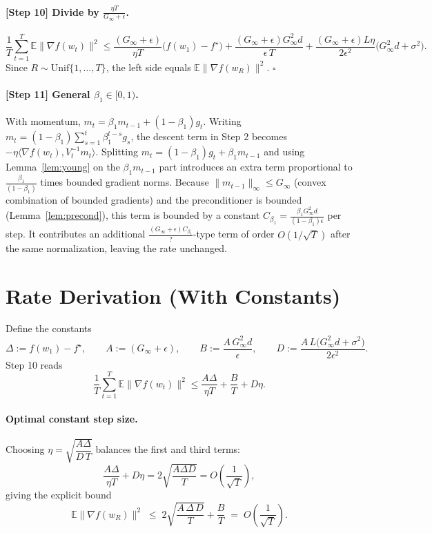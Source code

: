 \documentclass[11pt]{article}
\begin{document}
\paragraph{[Step 10] Divide by $\tfrac{\eta T}{G_\infty+\epsilon}$.}
\[
\frac{1}{T}\sum_{t=1}^T \mathbb{E}\|\nabla f(w_t)\|^2
\le \frac{(G_\infty+\epsilon)}{\eta T}\big(f(w_1)-f^\star\big)
+ \frac{(G_\infty+\epsilon)G_\infty^2 d}{\epsilon\, T}
+ \frac{(G_\infty+\epsilon)L\eta}{2\epsilon^2}\big(G_\infty^2 d + \sigma^2\big).
\]
Since $R\sim\mathrm{Unif}\{1,\dots,T\}$, the left side equals
$\mathbb{E}\|\nabla f(w_R)\|^2$. \hfill$\square$

\paragraph{[Step 11] General $\beta_1\in[0,1)$.}
With momentum, $m_t=\beta_1 m_{t-1}+(1-\beta_1)g_t$. Writing
$m_t=(1-\beta_1)\sum_{s=1}^t\beta_1^{t-s}g_s$, the descent term in Step 2
becomes $-\eta\langle\nabla f(w_t),V_t^{-1}m_t\rangle$. Splitting
$m_t = (1-\beta_1)g_t + \beta_1 m_{t-1}$ and using Lemma~\ref{lem:young} on the
$\beta_1 m_{t-1}$ part introduces an extra term proportional to
$\frac{\beta_1}{(1-\beta_1)}$ times bounded gradient norms. Because
$\|m_{t-1}\|_\infty\le G_\infty$ (convex combination of bounded gradients) and
the preconditioner is bounded (Lemma~\ref{lem:precond}), this term is bounded by
a constant $C_{\beta_1}=\frac{\beta_1 G_\infty^2 d}{(1-\beta_1)\epsilon}$ per
step. It contributes an additional
$\frac{(G_\infty+\epsilon)C_{\beta_1}}{?}$-type term of order $O(1/\sqrt T)$
after the same normalization, leaving the rate unchanged.

\section*{Rate Derivation (With Constants)}

Define the constants
\[
\Delta := f(w_1)-f^\star,\qquad
A := (G_\infty+\epsilon),\qquad
B := \frac{A\,G_\infty^2 d}{\epsilon},\qquad
D := \frac{A\,L\big(G_\infty^2 d+\sigma^2\big)}{2\epsilon^2}.
\]
Step 10 reads
\[
\frac1T\sum_{t=1}^T\mathbb{E}\|\nabla f(w_t)\|^2
\le \frac{A\Delta}{\eta T} + \frac{B}{T} + D\eta .
\]

\paragraph{Optimal constant step size.}
Choosing $\eta = \sqrt{\dfrac{A\Delta}{D\,T}}$ balances the first and third
terms:
\[
\frac{A\Delta}{\eta T} + D\eta
= 2\sqrt{\frac{A\Delta D}{T}}
= O\!\left(\frac{1}{\sqrt T}\right),
\]
giving the explicit bound
\[
\boxed{\;
\mathbb{E}\|\nabla f(w_R)\|^2
\;\le\;
2\sqrt{\frac{A\,\Delta\,D}{T}} + \frac{B}{T}
\;=\;
O\!\left(\frac{1}{\sqrt T}\right).
\;}
\]
\end{document}
